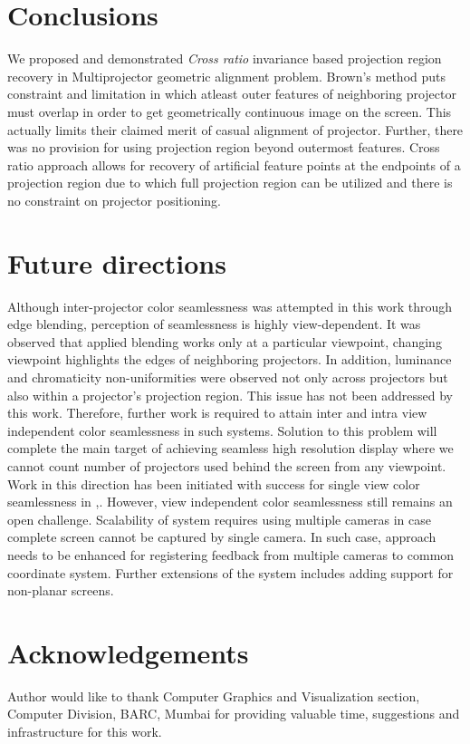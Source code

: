 \documentclass{article}
\begin{document}
\section{Conclusions}
    We proposed and demonstrated \textit{Cross ratio} invariance based projection region recovery in Multiprojector geometric alignment problem. Brown's method puts constraint and limitation in which atleast outer features of neighboring projector must overlap in order to get geometrically continuous image on the screen. This actually limits their claimed merit of casual alignment of projector. Further, there was no provision for using projection region beyond outermost features. Cross ratio approach allows for recovery of artificial feature points at the endpoints of a projection region due to which full projection region can be utilized and there is no constraint on projector positioning.


\section{Future directions}
    Although inter-projector color seamlessness was attempted in this work through edge blending, perception of seamlessness is highly view-dependent. It was observed that applied blending works only at a particular viewpoint, changing viewpoint highlights the edges of neighboring projectors. In addition, luminance and chromaticity non-uniformities were observed not only across projectors but also within a projector's projection region. This issue has not been addressed by this work. Therefore, further work is required to attain inter and intra view independent color seamlessness in such systems. Solution to this problem will complete the main target of achieving seamless high resolution display where we cannot count number of projectors used behind the screen from any viewpoint. Work in this direction has been initiated with success for single view color seamlessness in \cite{2},\cite{3}. However, view independent color seamlessness still remains an open challenge. Scalability of system requires using multiple cameras in case complete screen cannot be captured by single camera. In such case, approach needs to be enhanced for registering feedback from multiple cameras to common coordinate system. Further extensions of the system includes adding support for non-planar screens.

\section{Acknowledgements}
    Author would like to thank Computer Graphics and Visualization section, Computer Division, BARC, Mumbai for providing valuable time, suggestions and infrastructure for this work.
\end{document}
